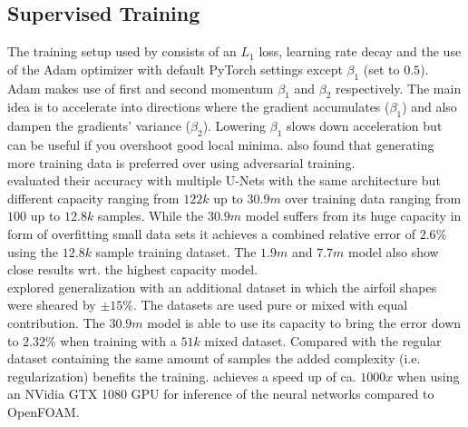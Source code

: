 \documentclass[acmtog]{techreportacmart}
\begin{document}
\subsection{Supervised Training}
The training setup used by \cite{Thuerey20} consists of an $L_1$ loss, learning rate decay and the 
use of the Adam optimizer \cite{kingma2014adam} with default PyTorch settings except $\beta_1$ 
(set to $0.5$). Adam makes use of first and second momentum $\beta_1$ and $\beta_2$ respectively. 
The main idea is to accelerate into directions where the gradient accumulates ($\beta_1$) and also 
dampen the gradients' variance ($\beta_2$). Lowering  $\beta_1$ slows down acceleration but can be 
useful if you overshoot good local minima. \cite{Thuerey20} also found that generating more 
training data is preferred over using adversarial training.\\
\cite{Thuerey20} evaluated their accuracy with multiple U-Nets with the same architecture but 
different capacity ranging from $122k$ up to $30.9m$ over training data ranging from $100$ up 
to $12.8k$ samples. While the $30.9m$ model suffers from its huge capacity in form of overfitting 
small data sets it achieves a combined relative error of $2.6\%$ using the $12.8k$ sample training 
dataset. The $1.9m$ and $7.7m$ model also show close results wrt. the highest capacity model.\\
\cite{Thuerey20} explored generalization with an additional dataset in which the airfoil shapes 
were sheared by $\pm15\%$. The datasets are used pure or mixed with equal contribution.
The $30.9m$ model is able to use its capacity to bring the error down to $2.32\%$ when training 
with a $51k$ mixed dataset. Compared with the regular dataset containing the same amount of 
samples the added complexity (i.e. regularization) benefits the training.
\cite{Thuerey20} achieves a speed up of ca. $1000x$ when using an NVidia GTX 1080 
GPU for inference of the neural networks compared to OpenFOAM.
\end{document}
